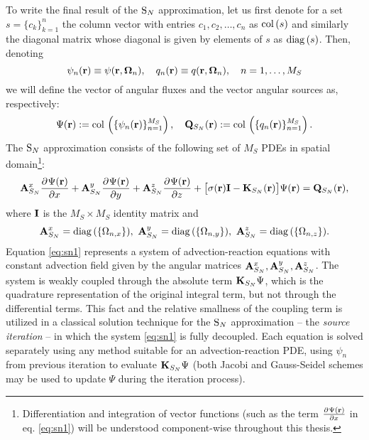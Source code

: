 To write  the final result of the $\text{S}_{N}$ approximation, let us first denote for a set $s = \{c_k\}_{k=1}^n$ the column
vector with entries $c_1,c_2,\ldots,c_n$ as $\operatorname{col\,}(s)$ and similarly the diagonal matrix whose diagonal is
given by elements of $s$ as $\operatorname{diag\,}(s)$. Then, denoting
\begin{equation}\label{eq:sn_vecs}
\psi_n(\mathbf{r}) \equiv \psi(\mathbf{r},\mathbf{\Omega}_n), \quad q_n(\mathbf{r}) \equiv
q(\mathbf{r},\mathbf{\Omega}_n),\quad n = 1,\ldots, M_S	
\end{equation}
we will define the vector of angular fluxes and the vector angular sources as, respectively:
\begin{equation}\label{eq:sn_vars}
\Psi(\mathbf{r}) := \operatorname{col\,}\left(\{\psi_n(\mathbf{r})\}_{n=1}^{M_S}\right),\quad
\mathbf{Q}_{S_N}(\mathbf{r}) := \operatorname{col\,}\left(\{q_n(\mathbf{r})\}_{n=1}^{M_S}\right).
\end{equation}
The $\text{S}_{N}$ approximation consists of the following set of $M_S$ PDEs in spatial domain\footnote{Differentiation and
integration of vector functions (such as the term $\frac{\partial^{}\Psi(\mathbf{r})}{\partial x^{}}$ in eq. \eqref{eq:sn1}) will be understood
component-wise throughout this thesis.}:
\begin{equation}\label{eq:sn1} 
\mathbf{A}_{S_N}^x\frac{\partial^{}\Psi(\mathbf{r})}{\partial x^{}} + \mathbf{A}_{S_N}^y\frac{\partial^{}\Psi(\mathbf{r})}{\partial y^{}} +
\mathbf{A}_{S_N}^z\frac{\partial^{}\Psi(\mathbf{r})}{\partial z^{}} + \bigl[\sigma(\mathbf{r})\mathbf{I} - \mathbf{K}_{S_N}(\mathbf{r})\bigr]\Psi(\mathbf{r}) = \mathbf{Q}_{S_N}(\mathbf{r}),
\end{equation}
where $\mathbf{I}$ is the $M_S\times M_S$ identity matrix and
$$
	\mat{A}_{S_N}^x = \diag(\{\Omega_{n,x}\}),\ \mat{A}_{S_N}^y = \diag(\{\Omega_{n,y}\}),\ \mat{A}_{S_N}^z =
	\diag(\{\Omega_{n,z}\}).
$$
Equation
\eqref{eq:sn1} represents a system of advection-reaction equations with constant advection field given by the angular 
matrices $\mathbf{A}_{S_N}^x, \mathbf{A}_{S_N}^y, \mathbf{A}_{S_N}^z$. The system is weakly coupled through the absolute term
$\mathbf{K}_{S_N}\Psi$, which is the quadrature representation of the original integral term, but not through the
differential terms. This fact and the relative smallness of the coupling term is utilized in a classical solution
technique for the $\text{S}_{N}$ approximation -- the \textit{source iteration} -- in which the system \eqref{eq:sn1} is fully
decoupled. Each equation is solved separately using any method suitable for an advection-reaction PDE, using $\psi_n$
from previous iteration to evaluate $\mathbf{K}_{S_N}\Psi$ (both Jacobi and Gauss-Seidel schemes may be used to update
$\Psi$ during the iteration process).

